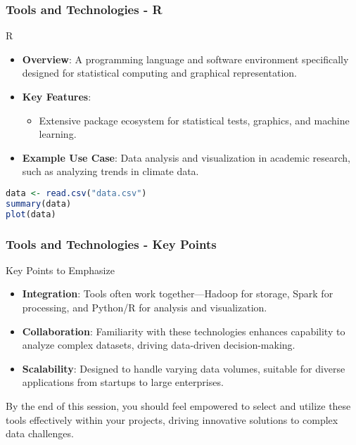 \documentclass[aspectratio=169]{beamer}
\begin{document}
\begin{frame}[fragile]
    \frametitle{Tools and Technologies - R}
    \begin{block}{R}
        \begin{itemize}
            \item \textbf{Overview}: A programming language and software environment specifically designed for statistical computing and graphical representation.
            \item \textbf{Key Features}:
            \begin{itemize}
                \item Extensive package ecosystem for statistical tests, graphics, and machine learning.
            \end{itemize}
            \item \textbf{Example Use Case}: Data analysis and visualization in academic research, such as analyzing trends in climate data.
        \end{itemize}
    \end{block}
    \begin{lstlisting}[language=R, basicstyle=\tiny]
data <- read.csv("data.csv")
summary(data)
plot(data)
    \end{lstlisting}
\end{frame}

\begin{frame}
    \frametitle{Tools and Technologies - Key Points}
    \begin{block}{Key Points to Emphasize}
        \begin{itemize}
            \item \textbf{Integration}: Tools often work together—Hadoop for storage, Spark for processing, and Python/R for analysis and visualization.
            \item \textbf{Collaboration}: Familiarity with these technologies enhances capability to analyze complex datasets, driving data-driven decision-making.
            \item \textbf{Scalability}: Designed to handle varying data volumes, suitable for diverse applications from startups to large enterprises.
        \end{itemize}
    \end{block}
    By the end of this session, you should feel empowered to select and utilize these tools effectively within your projects, driving innovative solutions to complex data challenges.
\end{frame}
\end{document}
